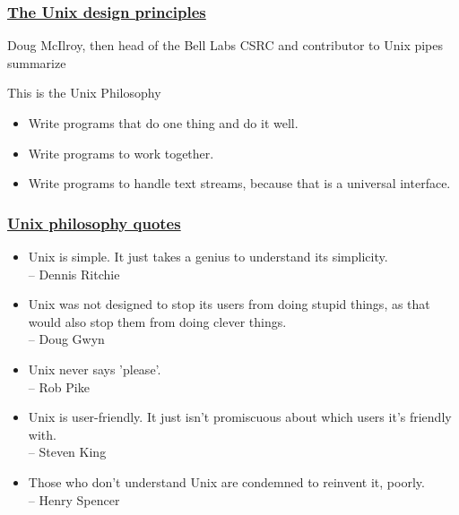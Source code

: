\documentclass[hyperref={pdfpagelabels=false},xcolor=pst,pdf,fragile]{beamer}
\begin{document}
\begin{frame}
  \frametitle{
	  \href{https://en.wikipedia.org/wiki/Unix_philosophy}
	  {The Unix design principles}
  }

  Doug McIlroy, then head of the Bell Labs CSRC and contributor to Unix
  pipes summarize

  \begin{block}{This is the Unix Philosophy}
	  \begin{itemize}
		  \item Write programs that do one thing and do it well.

		  \item Write programs to work together.

		  \item Write programs to handle text streams, because that is a universal interface.
	  \end{itemize}

  \end{block}

\end{frame}

\begin{frame}
	\frametitle{
		\href{https://en.wikipedia.org/wiki/Unix_philosophy\#Quotes}
		{Unix philosophy quotes}
	}

  \begin{itemize}
	  \item Unix is simple. It just takes a genius to understand its
		  simplicity. \\
		  – Dennis Ritchie

	  \item Unix was not designed to stop its users from doing stupid
		  things, as that would also stop them from doing clever things. \\
		  – Doug Gwyn

	  \item Unix never says 'please'. \\
		  – Rob Pike

		  \pause
	  \item Unix is user-friendly. It just isn't promiscuous about which
		  users it's friendly with.\\
		  – Steven King

	  \item Those who don't understand Unix are condemned to reinvent it,
		  poorly.\\
		  – Henry Spencer

  \end{itemize}

\end{frame}
\end{document}
